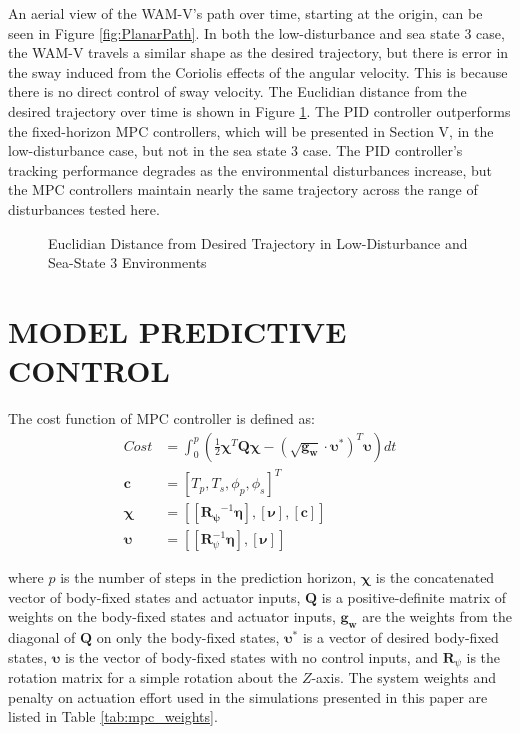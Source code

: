 \documentclass[letterpaper, 10 pt, conference]{ieeeconf}  %
\begin{document}
An aerial view of the WAM-V's path over time, starting at the origin, can be seen in Figure \ref{fig:PlanarPath}. In both the low-disturbance and sea state 3 case, the WAM-V travels a similar shape as the desired trajectory, but there is error in the sway induced from the Coriolis effects of the angular velocity. This is because there is no direct control of sway velocity. The Euclidian distance from the desired trajectory over time is shown in Figure \ref{fig:EOT}. The PID controller outperforms the fixed-horizon MPC controllers, which will be presented in Section V, in the low-disturbance case, but not in the sea state 3 case. The PID controller's tracking performance degrades as the environmental disturbances increase, but the MPC controllers maintain nearly the same trajectory across the range of disturbances tested here.
\begin{figure}[!b]
\begin{center}
\vspace{-0.125in}
\caption{Euclidian Distance from Desired Trajectory in Low-Disturbance and Sea-State 3 Environments}
\label{fig:EOT}
\end{center}
\vspace{-0.2in}
\end{figure}
%

\section{MODEL PREDICTIVE CONTROL}
The cost function of MPC controller is defined as:
%
\begin{align}
\label{cost}
Cost &= \int_0^p \left(\frac{1}{2}\bm{\chi}^T\bm{Q}\bm{\chi} - \left(\sqrt{\bm{g_w}} \cdot \bm{\upsilon}^*\right)^T\bm{\upsilon}\right)dt\\
\bm{c} &= \left[T_p, T_s, \phi_p, \phi_s\right]^T\\
\bm{\chi} &= \left[\left[\bm{R_{\psi}}^{-1}\bm{\eta}\right], \left[\bm{\nu}\right], \left[\bm{c}\right]\right]\\
\bm{\upsilon} &= \left[\left[\bm{R}_{\psi}^{-1}\bm{\eta}\right], \left[\bm{\nu}\right]\right]
\end{align}
%

where $p$ is the number of steps in the prediction horizon, $\bm{\chi}$ is the concatenated vector of body-fixed states and actuator inputs, $\bm{Q}$ is a positive-definite matrix of weights on the body-fixed states and actuator inputs, $\bm{g_w}$ are the weights from the diagonal of $\bm{Q}$ on only the body-fixed states, $\bm{\upsilon}^*$ is a vector of desired body-fixed states, $\bm{\upsilon}$ is the vector of body-fixed states with no control inputs, and $\bm{R}_{\psi}$ is the rotation matrix for a simple rotation about the $Z$-axis. The system weights and penalty on actuation effort used in the simulations presented in this paper are listed in Table \ref{tab:mpc_weights}.
%
\end{document}
